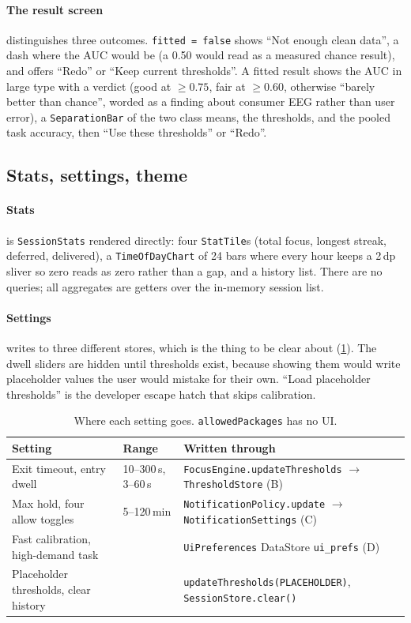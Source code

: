 \documentclass[10pt,a4paper]{article}
\newcommand{\code}[1]{\texttt{#1}}                  %
\begin{document}
\paragraph{The result screen} distinguishes three outcomes. \code{fitted = false} shows ``Not
enough clean data'', a dash where the AUC would be (a 0.50 would read as a measured chance result),
and offers ``Redo'' or ``Keep current thresholds''. A fitted result shows the AUC in large type with
a verdict (good at $\ge 0.75$, fair at $\ge 0.60$, otherwise ``barely better than chance'', worded
as a finding about consumer EEG rather than user error), a \code{SeparationBar} of the two class
means, the thresholds, and the pooled task accuracy, then ``Use these thresholds'' or ``Redo''.

\subsection{Stats, settings, theme}

\paragraph{Stats} is \code{SessionStats} rendered directly: four \code{StatTile}s (total focus,
longest streak, deferred, delivered), a \code{TimeOfDayChart} of 24 bars where every hour keeps a
2\,dp sliver so zero reads as zero rather than a gap, and a history list. There are no queries; all
aggregates are getters over the in-memory session list.

\paragraph{Settings} writes to three different stores, which is the thing to be clear about
(\cref{tab:settings}). The dwell sliders are hidden until thresholds exist, because showing them
would write placeholder values the user would mistake for their own. ``Load placeholder
thresholds'' is the developer escape hatch that skips calibration.

\begin{table}[htbp]\centering\small
\begin{tabularx}{\textwidth}{@{}l l X@{}}
\toprule
\textbf{Setting} & \textbf{Range} & \textbf{Written through} \\
\midrule
Exit timeout, entry dwell & 10--300\,s, 3--60\,s & \code{FocusEngine.updateThresholds} $\to$ \code{ThresholdStore} (B) \\
Max hold, four allow toggles & 5--120\,min & \code{NotificationPolicy.update} $\to$ \code{NotificationSettings} (C) \\
Fast calibration, high-demand task & & \code{UiPreferences} DataStore \code{ui\_prefs} (D) \\
Placeholder thresholds, clear history & & \code{updateThresholds(PLACEHOLDER)}, \code{SessionStore.clear()} \\
\bottomrule
\end{tabularx}
\caption{Where each setting goes. \code{allowedPackages} has no UI.}\label{tab:settings}
\end{table}
\end{document}
